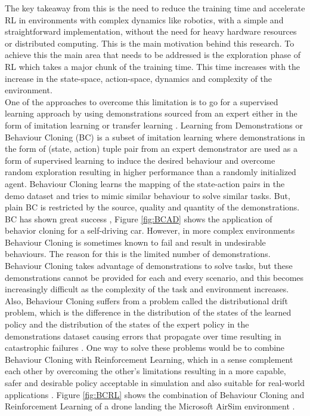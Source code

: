 The key takeaway from this is the need to reduce the training time and accelerate RL in environments with complex dynamics like robotics, with a simple and straightforward implementation, without the need for heavy hardware resources or distributed computing. This is the main motivation behind this research. To achieve this the main area that needs to be addressed is the exploration phase of RL which takes a major chunk of the training time. This time increases with the increase in the state-space, action-space, dynamics and complexity of the environment. \\

One of the approaches to overcome this limitation is to go for a supervised learning approach by using demonstrations sourced from an expert \cite{ARGALL2009469} \cite{RLFD} either in the form of imitation learning \cite{reddy2019sqil} \cite{ILRL} \cite{luo2021selfimitation} \cite{luo2020selfimitation} or transfer learning \cite{Taylor2009TransferLF} \cite{TLMARLS} \cite{zhu2021transfer} \cite{ILTLRL}. Learning from Demonstrations or Behaviour Cloning (BC) is a subset of imitation learning where demonstrations in the form of (state, action) tuple pair from an expert demonstrator are used as a form of supervised learning to induce the desired behaviour and overcome random exploration resulting in higher performance than a randomly initialized agent. Behaviour Cloning learns the mapping of the state-action pairs in the demo dataset and tries to mimic similar behaviour to solve similar tasks. But, plain BC is restricted by the source, quality and quantity of the demonstrations. BC has shown great success \cite{BCAD} \cite{sumanth2020enhanced}, Figure \ref{fig:BCAD} shows the application of behavior cloning for a self-driving car. However, in more complex environments Behaviour Cloning is sometimes known to fail and result in undesirable behaviours. The reason for this is the limited number of demonstrations. Behaviour Cloning takes advantage of demonstrations to solve tasks, but these demonstrations cannot be provided for each and every scenario, and this becomes increasingly difficult as the complexity of the task and environment increases. Also, Behaviour Cloning suffers from a problem called the distributional drift problem, which is the difference in the distribution of the states of the learned policy and the distribution of the states of the expert policy in the demonstrations dataset causing errors that propagate over time resulting in catastrophic failures \cite{goecks2020integrating} \cite{codevilla2019exploring}. One way to solve these problems would be to combine Behaviour Cloning with Reinforcement Learning, which in a sense complement each other by overcoming the other's limitations resulting in a more capable, safer and desirable policy acceptable in simulation and also suitable for real-world applications \cite{gao2019reinforcement} \cite{nair2018overcoming} \cite{vecerik2018leveraging}. Figure \ref{fig:BCRL} shows the combination of Behaviour Cloning and Reinforcement Learning of a drone landing the Microsoft AirSim environment \cite{shah2017airsim}. \\

